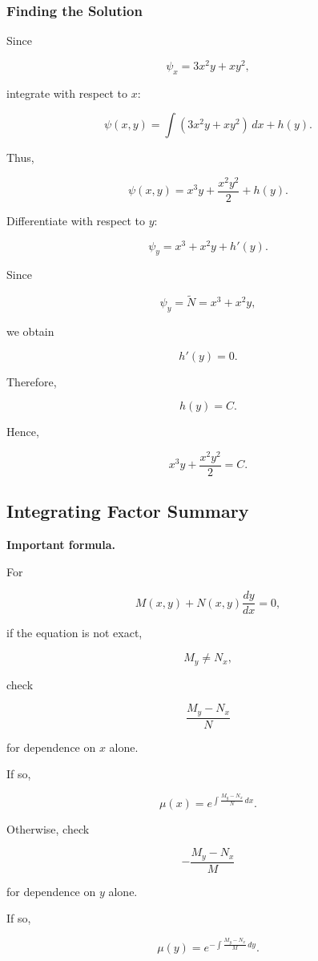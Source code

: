 \documentclass[11pt]{article}
\newenvironment{formulabox}
    {\par\medskip\noindent\textbf{Important formula.}\par}
    {\par\medskip}
\begin{document}
\subsubsection{Finding the Solution}

Since

\[
\psi_x
=
3x^2y+xy^2,
\]

integrate with respect to $x$:

\[
\psi(x,y)
=
\int(3x^2y+xy^2)\,dx+h(y).
\]

Thus,

\[
\psi(x,y)
=
x^3y+\frac{x^2y^2}{2}+h(y).
\]

Differentiate with respect to $y$:

\[
\psi_y
=
x^3+x^2y+h'(y).
\]

Since

\[
\psi_y
=
\widetilde{N}
=
x^3+x^2y,
\]

we obtain

\[
h'(y)=0.
\]

Therefore,

\[
h(y)=C.
\]

Hence,

\[
\boxed{
x^3y+\frac{x^2y^2}{2}=C
}.
\]

\subsection{Integrating Factor Summary}

\begin{formulabox}

For

\[
M(x,y)+N(x,y)\frac{dy}{dx}=0,
\]

if the equation is not exact,

\[
M_y\neq N_x,
\]

check

\[
\boxed{
\frac{M_y-N_x}{N}
}
\]

for dependence on $x$ alone.

If so,

\[
\boxed{
\mu(x)
=
e^{\int\frac{M_y-N_x}{N}\,dx}
}.
\]

Otherwise, check

\[
\boxed{
-\frac{M_y-N_x}{M}
}
\]

for dependence on $y$ alone.

If so,

\[
\boxed{
\mu(y)
=
e^{-\int\frac{M_y-N_x}{M}\,dy}
}.
\]

\end{formulabox}
\end{document}
